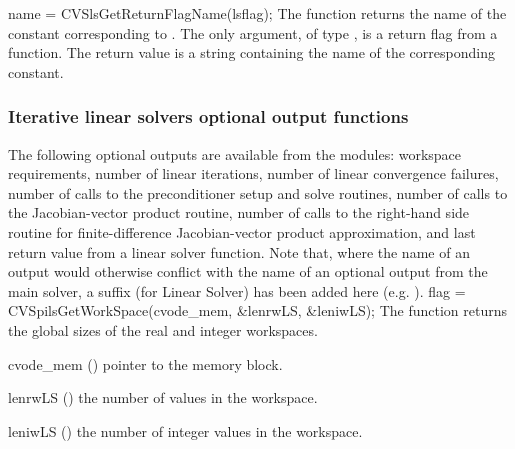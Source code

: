 {
}
{
  name = CVSlsGetReturnFlagName(lsflag);
}
{
  The function  returns the
  name of the {\cvsls} constant corresponding to .
}
{
  The only argument, of type , is a return flag from a {\cvsls}
  function.
}
{
  The return value is a string containing the name of the corresponding constant.
}
{}


\subsubsection{Iterative linear solvers optional output functions}
\label{sss:optout_spils}
The following optional outputs are available from the {\cvspils}
modules: workspace requirements, number of linear iterations, number of
linear convergence failures, number of calls to the preconditioner
setup and solve routines, number of calls to the Jacobian-vector
product routine, number of calls to the right-hand side routine for
finite-difference Jacobian-vector product approximation, and last
return value from a linear solver function.
Note that, where the name of an output would otherwise conflict with
the name of an optional output from the main solver, a suffix 
(for Linear Solver) has been added here (e.g.  ).
{
  flag = CVSpilsGetWorkSpace(cvode\_mem, \&lenrwLS, \&leniwLS);
}
{
  The function  returns the global sizes of the
  {\cvspils} real and integer workspaces.
}
{
  \begin{args}
  \item[cvode\_mem] ()
    pointer to the {\cvode} memory block.
  \item[lenrwLS] ()
    the number of  values in the {\cvspils} workspace.
  \item[leniwLS] ()
    the number of integer values in the {\cvspils} workspace.
  \end{args}
}
